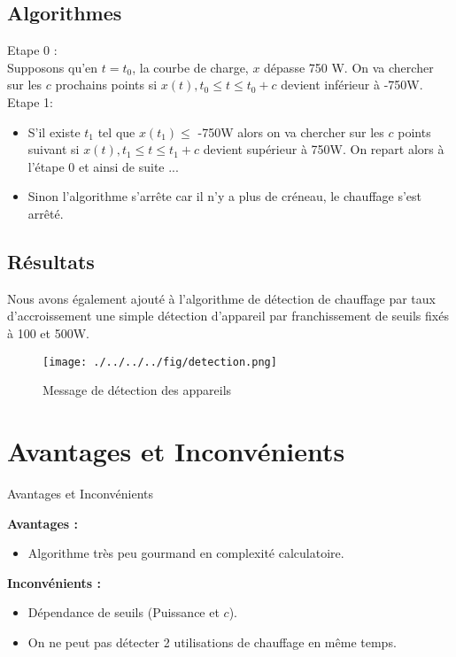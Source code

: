 \documentclass{beamer}
\begin{document}
\subsection{Algorithmes}
\begin{frame}
Etape 0 :\\
Supposons qu'en $t = t_0$, la courbe de charge, $x$ dépasse 750 W. On va chercher sur les $c$ prochains points si $x(t), t_0 \le t \le t_0 + c $ devient inférieur à -750W.\\
\vspace{0.5 cm}
Etape 1:\\
\begin{itemize}
	\item S'il existe $t_1$ tel que $x(t_1) \le$ -750W alors on va chercher sur les $c$ points suivant si $x(t), t_1 \le t \le t_1 + c $ devient supérieur à 750W. On repart alors à l'étape 0 et ainsi de suite ...
	\item Sinon l'algorithme s'arrête car il n'y a plus de créneau, le chauffage s'est arrêté.
\end{itemize}
\end{frame}

\subsection{Résultats}
\begin{frame}
Nous avons également ajouté à l'algorithme de détection de chauffage par taux d'accroissement une simple détection d'appareil par franchissement de seuils fixés à 100 et 500W.
\begin{figure}[!h]
\begin{center}
\texttt{[image: ./../../../fig/detection.png]}
\caption{Message de détection des appareils}
\label{Figure2}
\end{center}
\end{figure}
\end{frame}

\section{Avantages et Inconvénients}

\begin{frame}{Avantages et Inconvénients}
\end{frame}

\begin{frame}
\textbf{Avantages :} \\
\begin{itemize}
	\item Algorithme très peu gourmand en complexité calculatoire.
\end{itemize}
\textbf{Inconvénients :} \\
\begin{itemize}
	\item Dépendance de seuils (Puissance et $c$).
	\item On ne peut pas détecter 2 utilisations de chauffage en même temps.
\end{itemize}
\end{frame}
\end{document}
